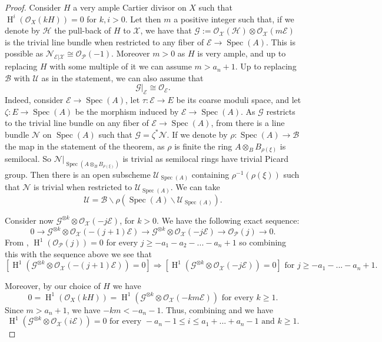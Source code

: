 \documentclass{amsart}
\newcommand{\oH}{\operatorname{H}}
\newcommand{\cB}{\mathcal{B}}
\newcommand{\cE}{\mathcal{E}}
\newcommand{\cG}{\mathcal{G}}
\newcommand{\cH}{\mathcal{H}}
\newcommand{\cN}{\mathcal{N}}
\newcommand{\cO}{\mathcal{O}}
\newcommand{\cP}{\mathcal{P}}
\newcommand{\cU}{\mathcal{U}}
\newcommand{\cX}{\mathcal{X}}
\newcommand{\spec}{\operatorname{Spec}}
\theoremstyle{definition}
\begin{document}
\begin{proof}
Consider $H$ a very ample Cartier divisor on $X$ such that $\oH^i(\cO_X(kH))=0$ for $k,i>0$. Let then $m$ a positive integer such that, if we denote by $\cH$ the pull-back of $H$ to $\cX$, we have that
$\cG:=\cO_\cX(\cH)\otimes\cO_{\cX}(m\cE)$ is the trivial line bundle when restricted to any fiber of $\cE\to \spec(A)$. 
This is possible as $\cN_{\cE\vert\cX}\cong\cO_\cP(-1)$. Moreover $m>0$ as $H$ is very ample, and up to replacing $H$ with some multiple of it we can assume $m>a_n+1$. Up to replacing $\cB$ with $\cU$ as in the statement, we can also assume that $$\cG|_\cE\cong \cO_{\cE}.$$ 
{Indeed, consider $\cE\to \spec(A)$, let $\tau:\cE\to E$ be its coarse moduli space, and let $\zeta:E\to \spec(A)$ be the morphism induced by $\cE\to \spec(A)$. As $\cG$ restricts to the trivial line bundle on any fiber of $\cE\to \spec(A)$, from \cite[Cor. 4.3]{noohipicard} there is a line bundle $\cN$ on $\spec(A)$ such that $\cG=\zeta^*\cN$. If we denote by $\rho:\spec(A)\to \cB$ the map in the statement of the theorem, as $\rho$ is finite the ring $A\otimes_BB_{\rho(\xi)}$ is semilocal. So $\cN|_{\spec(A\otimes_BB_{\rho(\xi)})}$ is trivial as semilocal rings have trivial Picard group. Then there is an open subscheme $\cU_{\spec(A)}$ containing $\rho^{-1}(\rho(\xi))$ such that $\cN$ is trivial when restricted to $\cU_{\spec(A)}$. We can take \[\cU=\cB\smallsetminus\rho(\spec(A)\smallsetminus \cU_{\spec(A)}).\] }

Consider now $\cG^{\otimes k}\otimes \cO_{\cX}(-j\cE)$, for $k> 0$. We have the following exact sequence:
$$0\to \cG^{\otimes k}\otimes \cO_{\cX}(-(j+1)\cE) \to \cG^{\otimes k}\otimes \cO_{\cX}(-j\cE)\to \cO_{\cP}(j)\to 0.$$
From \cite[Prop. 2.5]{meier2015vector}, $\oH^1(\cO_{\cP}(j))=0$ for every $j\ge -a_1 - a_2 - ... - a_n + 1$ so combining this with the sequence above we see that 
\begin{equation}\label{eq_1}
[\oH^1(\cG^{\otimes k}\otimes \cO_{\cX}(-(j+1)\cE))=0] \Longrightarrow [\oH^1(\cG^{\otimes k}\otimes \cO_{\cX}(-j\cE))=0] \text{ for }j\ge -a_1 -  ... - a_n + 1.
\end{equation}


Moreover, by our choice of $H$ we have
\begin{equation}\label{eq_2}
    0 = \oH^1(\cO_X(kH)) = \oH^1(\cG^{\otimes k}\otimes \cO_{\cX}(-km\cE))\text{ for every }k\ge1.
\end{equation} Since $m> a_n + 1$,  we have $-km<-a_n-1$. Thus, combining  and  we have
$$\oH^1(\cG^{\otimes k}\otimes \cO_{\cX}(i\cE))=0\text{ for every }-a_n - 1 \le i \le a_1 + ... + a_n - 1\text{ and }k\ge 1.$$



\end{proof}
\end{document}
